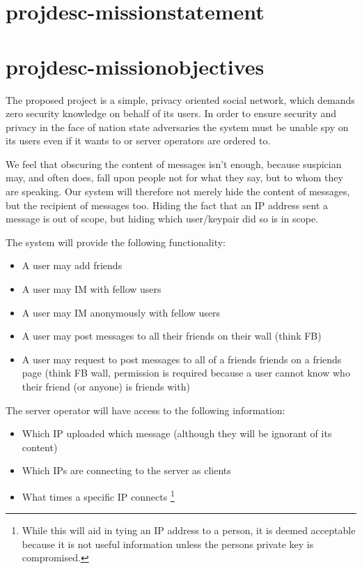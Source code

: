 \section{projdesc-missionstatement}

\section{projdesc-missionobjectives}
The proposed project is a simple, privacy oriented social network, which demands
zero security knowledge on behalf of its users. In order to ensure security and
privacy in the face of nation state adversaries the system must be unable spy on
its users even if it wants to or server operators are ordered to.

We feel that obscuring the content of messages isn't enough, because suspician
may, and often does, fall upon people not for what they say, but to whom they
are speaking. Our system will therefore not merely hide
the content of messages, but the recipient of messages too. Hiding the fact that
an IP address sent a message is out of scope, but hiding which user/keypair did
so is in scope.

The system will provide the following functionality:
\begin{itemize}
\item A user may add friends
\item A user may IM with fellow users
\item A user may IM anonymously with fellow users
\item A user may post messages to all their friends on their wall (think FB)
\item A user may request to post messages to all of a friends friends on a
friends page (think FB wall, permission is required because a user cannot know
who their friend (or anyone) is friends with)
\end{itemize}

The server operator will have access to the following information:
\begin{itemize}
\item Which IP uploaded which message (although they will be ignorant of its
content)
\item Which IPs are connecting to the server as clients
\item What times a specific IP connects \footnote {While this will aid in tying
an IP address to a person, it is deemed acceptable because it is not useful
information unless the persons private key is compromised.}
\end{itemize}

